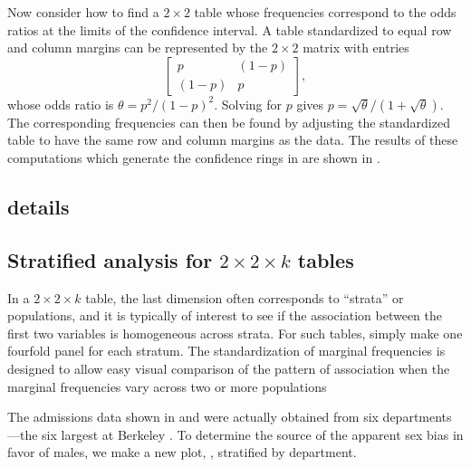 \documentclass[11pt]{book}\usepackage[]{graphicx}\usepackage[]{color}
\begin{document}
Now consider how to find a \(2 \times  2\) table whose frequencies
correspond to the odds ratios at the limits of the confidence
interval.  A table standardized to equal row and column margins can
be represented by the \(2 \times  2\) matrix with entries
\begin{equation*}
 \left[
  \begin{array}{cc}
   p & (1-p) \\
  (1-p) & p
  \end{array}
 \right]
 \comma
\end{equation*}
whose odds ratio is \(\theta  =  p^2 /  ( 1  -  p)^2\).  
Solving for $p$ gives \(p  =  \sqrt \theta /  ( 1  +  \sqrt \theta )\).  The
corresponding frequencies can then be found by adjusting the
standardized table to have the same row and column margins as the
data. The results of these computations which generate the confidence
rings in  are shown in .




\subsection{ details}

\subsection{Stratified analysis for $2 \times 2 \times k$ tables}\label{sec:twoway-fourstrat}
In a \(2 \times  2 \times  k\)
table, the last dimension often corresponds to ``strata'' or
populations, and it is typically of interest to see if the
association between the first two variables is homogeneous across
strata.  For such tables, simply make one fourfold panel for each
stratum.  The standardization of marginal frequencies is designed to
allow easy visual comparison of the pattern of association
when the marginal frequencies vary across two
or more populations

The admissions data shown in
 and  were actually obtained
from six departments ---the six largest at Berkeley
\citep{Bickel-etal:75}.
To determine the source of the apparent sex
bias in favor of males, we make a new plot, ,
stratified by department.
\end{document}
